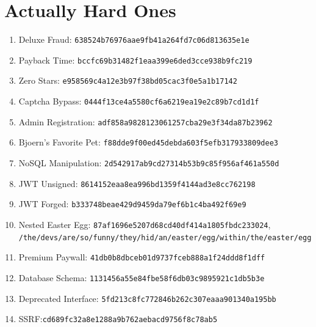 \documentclass[12pt, letterpaper]{article}
\begin{document}
\part*{Actually Hard Ones}
\begin{sloppypar}
    \begin{enumerate}
        \item Deluxe Fraud: \texttt{638524b76976aae9fb41a264fd7c06d813635e1e}
        \item Payback Time: \texttt{bccfc69b31482f1eaa399e6ded3cce938b9fc219}
        \item Zero Stars: \texttt{e958569c4a12e3b97f38bd05cac3f0e5a1b17142}
        \item Captcha Bypass: \texttt{0444f13ce4a5580cf6a6219ea19e2c89b7cd1d1f}
        \item Admin Registration: \texttt{adf858a9828123061257cba29e3f34da87b23962}
        \item Bjoern's Favorite Pet: \texttt{f88dde9f00ed45debda603f5efb317933809dee3}
        \item NoSQL Manipulation: \texttt{2d542917ab9cd27314b53b9c85f956af461a550d}
        \item JWT Unsigned: \texttt{8614152eaa8ea996bd1359f4144ad3e8cc762198}
        \item JWT Forged: \texttt{b333748beae429d9459da79ef6b1c4ba492f69e9}
        \item Nested Easter Egg: \texttt{87af1696e5207d68cd40df414a1805fbdc233024}, \texttt{/the/devs/are/so/funny/they/hid/an/easter/egg/within/the/easter/egg}
        \item Premium Paywall: \texttt{41db0b8dbceb01d9737fceb888a1f24ddd8f1dff}
        \item Database Schema: \texttt{1131456a55e84fbe58f6db03c9895921c1db5b3e}
        \item Deprecated Interface: \texttt{5fd213c8fc772846b262c307eaaa901340a195bb}
        \item SSRF:\texttt{cd689fc32a8e1288a9b762aebacd9756f8c78ab5}
    \end{enumerate}
\end{sloppypar}
\end{document}
